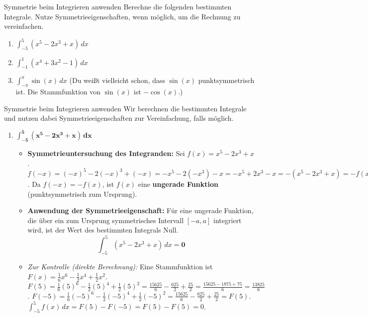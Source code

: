 \begin{aufgabenumgebung}{Symmetrie beim Integrieren anwenden}
Berechne die folgenden bestimmten Integrale. Nutze Symmetrieeigenschaften, wenn möglich, um die Rechnung zu vereinfachen.
\begin{enumerate}
    \item $\int_{-5}^{5} (x^5 - 2x^3 + x) \,dx$
    \item $\int_{-1}^{1} (x^4 + 3x^2 - 1) \,dx$
    \item $\int_{-\pi}^{\pi} \sin(x) \,dx$ (Du weißt vielleicht schon, dass $\sin(x)$ punktsymmetrisch ist. Die Stammfunktion von $\sin(x)$ ist $-\cos(x)$.)
\end{enumerate}
\end{aufgabenumgebung}


\begin{loesungsumgebung}{Symmetrie beim Integrieren anwenden}
Wir berechnen die bestimmten Integrale und nutzen dabei Symmetrieeigenschaften zur Vereinfachung, falls möglich.

\begin{enumerate}[label=(\alph*)]
    \item $\mathbf{\int_{-5}^{5} (x^5 - 2x^3 + x) \,dx}$
    \begin{itemize}
        \item \textbf{Symmetrieuntersuchung des Integranden:}
        Sei $f(x) = x^5 - 2x^3 + x$.
        $f(-x) = (-x)^5 - 2(-x)^3 + (-x) = -x^5 - 2(-x^3) - x = -x^5 + 2x^3 - x = -(x^5 - 2x^3 + x) = -f(x)$.
        Da $f(-x) = -f(x)$, ist $f(x)$ eine \textbf{ungerade Funktion} (punktsymmetrisch zum Ursprung).
        \item \textbf{Anwendung der Symmetrieeigenschaft:}
        Für eine ungerade Funktion, die über ein zum Ursprung symmetrisches Intervall $[-a, a]$ integriert wird, ist der Wert des bestimmten Integrals Null.
        $$ \int_{-5}^{5} (x^5 - 2x^3 + x) \,dx = \mathbf{0} $$
        \item \textit{Zur Kontrolle (direkte Berechnung):}
        Eine Stammfunktion ist $F(x) = \frac{1}{6}x^6 - \frac{1}{2}x^4 + \frac{1}{2}x^2$.
        $F(5) = \frac{1}{6}(5)^6 - \frac{1}{2}(5)^4 + \frac{1}{2}(5)^2 = \frac{15625}{6} - \frac{625}{2} + \frac{25}{2} = \frac{15625 - 1875 + 75}{6} = \frac{13825}{6}$.
        $F(-5) = \frac{1}{6}(-5)^6 - \frac{1}{2}(-5)^4 + \frac{1}{2}(-5)^2 = \frac{15625}{6} - \frac{625}{2} + \frac{25}{2} = F(5)$.
        $\int_{-5}^{5} f(x) \,dx = F(5) - F(-5) = F(5) - F(5) = 0$.
    \end{itemize}


\end{enumerate}
\end{loesungsumgebung}

